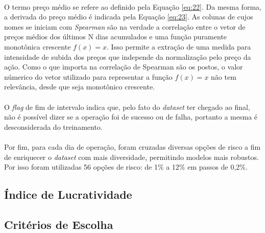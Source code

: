 \paragraph{} O termo preço médio se refere ao definido pela Equação \ref{eq:22}. Da mesma forma, a derivada do preço médio é indicada pela Equação \ref{eq:23}. As colunas de cujos nomes se iniciam com \textit{Spearman} são na verdade a correlação entre o vetor de preços médios dos últimos N dias acumulados e uma função puramente monotônica crescente \begin{math} f(x) = x \end{math}. Isso permite a extração de uma medida para intensidade de subida dos preços que independe da normalização pelo preço da ação. Como o que importa na correlação de Spearman são os postos, o valor númerico do vetor utilizado para representar a função \begin{math} f(x) = x \end{math} não tem relevância, desde que seja monotônico crescente.

\paragraph{} O \textit{flag} de fim de intervalo indica que, pelo fato do \textit{dataset} ter chegado ao final, não é possível dizer se a operação foi de sucesso ou de falha, portanto a mesma é desconsiderada do treinamento.

\paragraph{} Por fim, para cada dia de operação, foram cruzadas diversas opções de risco a fim de enriquecer o \textit{dataset} com mais diversidade, permitindo modelos mais robustos. Por isso foram utilizadas 56 opções de risco: de 1\% a 12\% em passos de 0,2\%.



\subsection{Índice de Lucratividade}
\paragraph{}



\subsection{Critérios de Escolha}

